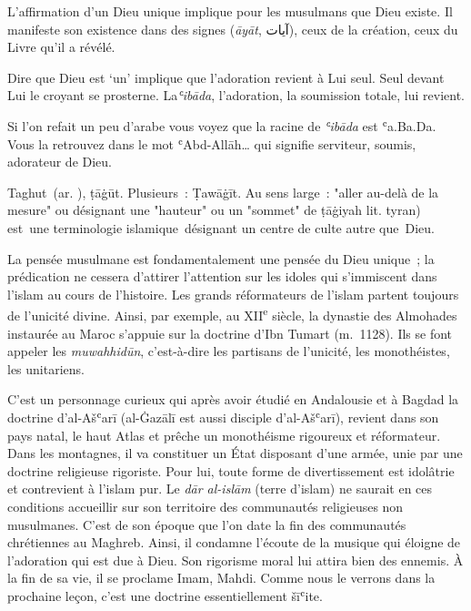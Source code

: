 L'affirmation d'un Dieu unique implique pour les musulmans que Dieu
existe. Il manifeste son existence dans des signes (\emph{āyāt}, آيات),
ceux de la création, ceux du Livre qu'il a révélé.

Dire que Dieu est `un' implique que l'adoration revient à Lui seul. Seul
devant Lui le croyant se prosterne. La\emph{ʿibāda}, l'adoration, la
soumission totale, lui revient.

Si l'on refait un peu d'arabe vous voyez que la racine de \emph{ʿibāda}
est ʿa.Ba.Da. Vous la retrouvez dans le mot ʿAbd-Allāh\ldots{} qui
signifie serviteur, soumis, adorateur de Dieu.


\begin{Def}[Taghut]
{Taghut~(ar.  ), ṭāġūt. Plusieurs~: Ṭawāġīt. Au sens large~: "aller au-delà de la mesure" ou désignant une "hauteur" ou un "sommet" de ṭāġiyah  lit. tyran) est~une terminologie islamique~désignant un centre de culte autre que~Dieu.}
\end{Def}

La pensée musulmane est fondamentalement une pensée du Dieu unique~; la
prédication ne cessera d'attirer l'attention sur les idoles qui
s'immiscent dans l'islam au cours de l'histoire. Les grands réformateurs
de l'islam partent toujours de l'unicité divine. Ainsi, par exemple, au
XII\textsuperscript{e} siècle, la dynastie des Almohades instaurée au
Maroc s'appuie sur la doctrine d'Ibn Tumart (m.~1128). Ils se font
appeler les \emph{muwahhidūn}, c'est-à-dire les partisans de l'unicité,
les monothéistes, les unitariens.





C'est un personnage curieux qui après
avoir étudié en Andalousie et à Bagdad la doctrine d'al-Ašʿarī
(al-Ġazālī est aussi disciple d'al-Ašʿarī), revient dans son pays natal,
le haut Atlas et prêche un monothéisme rigoureux et réformateur. Dans
les montagnes, il va constituer un État disposant d'une armée, unie par
une doctrine religieuse rigoriste. Pour lui, toute forme de
divertissement est idolâtrie et contrevient à l'islam pur. Le \emph{dār
al-islām} (terre d'islam) ne saurait en ces conditions accueillir sur
son territoire des communautés religieuses non musulmanes. C'est de son
époque que l'on date la fin des communautés chrétiennes au Maghreb.
Ainsi, il condamne l'écoute de la musique qui éloigne de l'adoration qui
est due à Dieu. Son rigorisme moral lui attira bien des ennemis. À la
fin de sa vie, il se proclame Imam, Mahdi. Comme nous le verrons dans la
prochaine leçon, c'est une doctrine essentiellement šīʿite.


